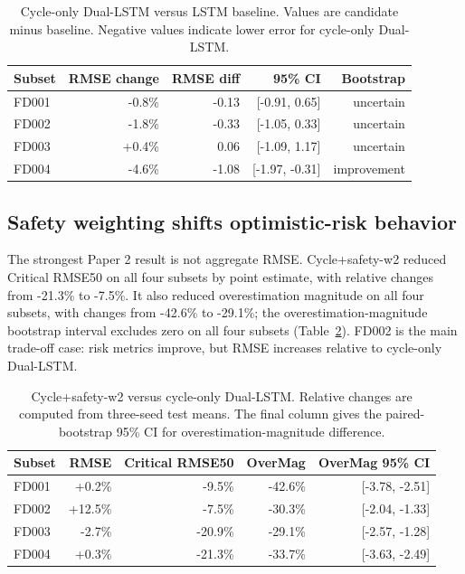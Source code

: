 \documentclass[10pt,twocolumn]{article}
\begin{document}
\begin{table}[t]
\centering
\caption{Cycle-only Dual-LSTM versus LSTM baseline. Values are candidate minus baseline. Negative values indicate lower error for cycle-only Dual-LSTM.}
\label{tab:cycle}
\small
\begin{tabular}{lrrrr}
\toprule
Subset & RMSE change & RMSE diff & 95\% CI & Bootstrap \\
\midrule
FD001 & -0.8\% & -0.13 & [-0.91, 0.65] & uncertain \\
FD002 & -1.8\% & -0.33 & [-1.05, 0.33] & uncertain \\
FD003 & +0.4\% & 0.06 & [-1.09, 1.17] & uncertain \\
FD004 & -4.6\% & -1.08 & [-1.97, -0.31] & improvement \\
\bottomrule
\end{tabular}
\end{table}

\subsection{Safety weighting shifts optimistic-risk behavior}
The strongest Paper 2 result is not aggregate RMSE. Cycle+safety-w2 reduced Critical RMSE50 on all four subsets by point estimate, with relative changes from -21.3\% to -7.5\%. It also reduced overestimation magnitude on all four subsets, with changes from -42.6\% to -29.1\%; the overestimation-magnitude bootstrap interval excludes zero on all four subsets (Table~\ref{tab:safety}). FD002 is the main trade-off case: risk metrics improve, but RMSE increases relative to cycle-only Dual-LSTM.

\begin{table}[t]
\centering
\caption{Cycle+safety-w2 versus cycle-only Dual-LSTM. Relative changes are computed from three-seed test means. The final column gives the paired-bootstrap 95\% CI for overestimation-magnitude difference.}
\label{tab:safety}
\small
\begin{tabular}{lrrrr}
\toprule
Subset & RMSE & Critical RMSE50 & OverMag & OverMag 95\% CI \\
\midrule
FD001 & +0.2\% & -9.5\% & -42.6\% & [-3.78, -2.51] \\
FD002 & +12.5\% & -7.5\% & -30.3\% & [-2.04, -1.33] \\
FD003 & -2.7\% & -20.9\% & -29.1\% & [-2.57, -1.28] \\
FD004 & +0.3\% & -21.3\% & -33.7\% & [-3.63, -2.49] \\
\bottomrule
\end{tabular}
\end{table}
\end{document}
